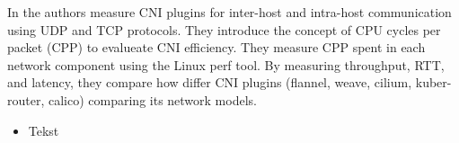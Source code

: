 In \cite{9153266} the authors measure CNI plugins for inter-host and intra-host communication using UDP and TCP protocols. They introduce the concept of CPU cycles per packet (CPP) to evalueate CNI efficiency. They measure CPP spent in each network component using the Linux perf tool. By measuring throughput, RTT, and latency, they compare how differ CNI plugins (flannel, weave, cilium, kuber-router, calico) comparing its network models.


\begin{itemize}
\item Tekst
\end{itemize}
